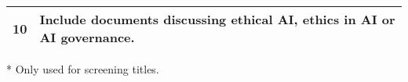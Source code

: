 \begin{table}[htp]
\begin{threeparttable}
\begin{tabular}{cp{}}
        \midrule
        10\tnote{*} & \textbf{Include} documents discussing ethical AI, ethics in AI or AI governance. \\
    \bottomrule
    \end{tabular}
    \begin{tablenotes}
        \footnotesize
        \item [*] Only used for screening titles.
    \end{tablenotes}
\end{threeparttable}
\end{table}
